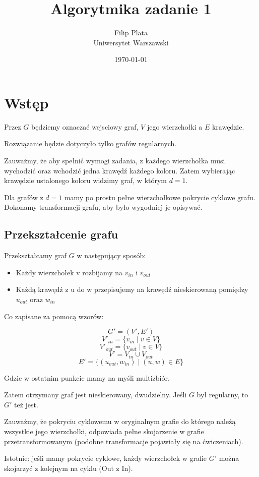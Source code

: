 \documentclass[12pt]{article}
\title{Algorytmika zadanie 1}
\author{
        Filip Plata \\
        Uniwersytet Warszawski
}
\date{\today}
\begin{document}
\maketitle

\section{Wstęp}

Przez $G$ będziemy oznaczać wejsciowy graf, $V$ jego wierzchołki a $E$ krawędzie.

Rozwiązanie będzie dotyczyło tylko grafów regularnych.

Zauważmy, że aby spełnić wymogi zadania, z każdego wierzchołka musi wychodzić oraz wchodzić jedna krawędź każdego koloru. Zatem wybierając krawędzie ustalonego koloru widzimy graf, w którym $d=1$.

Dla grafów z $d=1$ mamy po prostu pełne wierzchołkowe pokrycie cyklowe grafu. Dokonamy transformacji grafu, aby było wygodniej je opisywać.

\subsection{Przekształcenie grafu}
\label{ssec:trans}

Przekształcamy graf $G$ w następujący sposób:

\begin{itemize}
\item Każdy wierzchołek v rozbijamy na $v_{in}$ i $v_{out}$
\item Każdą krawędź z u do w przepisujemy na krawędź nieskierowaną pomiędzy $u_{out}$ oraz $w_{in}$
\end{itemize}

Co zapisane za pomocą wzorów:

\[ G' = (V', E') \]
\[ V'_{in} = \{ v_{in} \mid v \in V \} \]
\[ V'_{out} = \{  v_{out} \mid v \in V \} \]
\[ V' = V_{in} \cup V_{out} \]
\[ E' = \{ (u_{out}, w_{in}) \mid (u,w) \in E \} \]

Gdzie w ostatnim punkcie mamy na myśli multizbiór.

Zatem otrzymany graf jest nieskierowany, dwudzielny.
Jeśli $G$ był regularny, to $G'$ też jest.

Zauważmy, że pokryciu cyklowemu w oryginalnym grafie do którego należą wszystkie jego wierzchołki, odpowiada pełne skojarzenie w grafie przetransformowanym (podobne transformacje pojawiały się na ćwiczeniach).

Istotnie: jeśli mamy pokrycie cyklowe, każdy wierzchołek w grafie $G'$ można skojarzyć z kolejnym na cyklu (Out z In).
\end{document}

